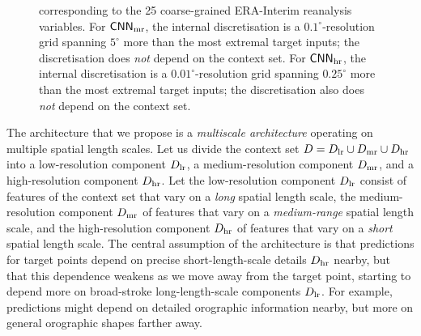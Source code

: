 \documentclass[12pt, twoside]{report}
\newcommand{\xrprefix}[1]{xr-#1}
\begin{document}
\begin{figure}[t]
{        corresponding to the 25 coarse-grained ERA-Interim reanalysis variables.
        For $\mathsf{CNN}\ss{mr}$, the internal discretisation is a $0.1^\circ$-resolution grid
        spanning $5^\circ$ more than the most extremal target inputs;
        the discretisation does \emph{not} depend on the context set.
        For $\mathsf{CNN}\ss{hr}$, the internal discretisation is a $0.01^\circ$-resolution grid
        spanning $0.25^\circ$ more than the most extremal target inputs;
        the discretisation also does \emph{not} depend on the context set.
    }
    \label{fig:multires_arch}
\end{figure}

The architecture that we propose is a \emph{multiscale architecture} operating on multiple spatial length scales.
Let us divide the context set $D = D\ss{lr} \cup D\ss{mr} \cup D\ss{hr}$ into
a low-resolution component $D\ss{lr}$, a medium-resolution component $D\ss{mr}$, and a high-resolution component $D\ss{hr}$.
Let the low-resolution component $D\ss{lr}$ consist of features of the context set that vary on a \emph{long} spatial length scale,
the medium-resolution component $D\ss{mr}$ of features that vary on a \emph{medium-range} spatial length scale,
and the high-resolution component $D\ss{hr}$ of features that vary on a \emph{short} spatial length scale. 
The central assumption of the architecture is that predictions for target points depend on precise short-length-scale details $D\ss{hr}$ nearby, but that this dependence weakens as we move away from the target point, starting to depend more on broad-stroke long-length-scale components $D\ss{lr}$.
For example, 
predictions might depend on detailed orographic information nearby,
but more on general orographic shapes farther away.

\end{document}

